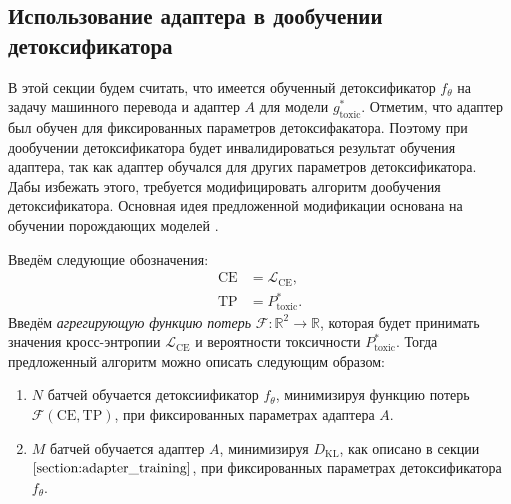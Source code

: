 \subsection{Использование адаптера в дообучении детоксификатора}
\label{section:posttrain}
В этой секции будем считать, что имеется обученный детоксификатор $f_{\theta}$ на задачу машинного перевода и адаптер $A$ для модели $g^{*}_{\text{toxic}}$.
Отметим, что адаптер был обучен для фиксированных параметров детоксифакатора. 
Поэтому при дообучении детоксификатора будет инвалидироваться результат обучения адаптера, так как адаптер обучался для других параметров детоксификатора.
Дабы избежать этого, требуется модифицировать алгоритм дообучения детоксификатора. 
Основная идея предложенной модификации основана на обучении порождающих моделей \cite{10.5555/2969033.2969125}.

Введём следующие обозначения:
\begin{align*}
    \text{CE} &= \mathcal{L}_{\text{CE}},\\
    \text{TP} &= P^{*}_{\text{toxic}}.
\end{align*}
Введём \textit{агрегирующую функцию потерь} $\mathcal{F}: \mathbb{R}^2 \to \mathbb{R}$, которая будет принимать значения кросс-энтропии $\mathcal{L}_{\text{CE}}$ и вероятности токсичности $P^{*}_{\text{toxic}}$.
Тогда предложенный алгоритм можно описать следующим образом: 
\begin{enumerate}
    \item $N$ батчей обучается детоксиификатор $f_{\theta}$, минимизируя функцию потерь $\mathcal{F} (\text{CE}, \text{TP})$, при фиксированных параметрах адаптера $A$.
    \item $M$ батчей обучается адаптер $A$, минимизируя $D_{\text{KL}}$, как описано в секции $\ref{section:adapter_training}$, при фиксированных параметрах детоксификатора $f_{\theta}$. 
\end{enumerate}